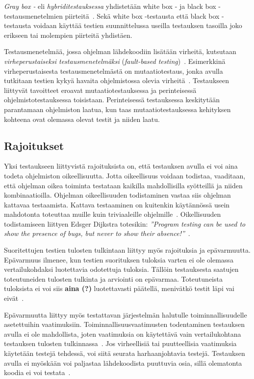 \documentclass[finnish, grading]{tktltiki2}
\theoremstyle{definition}
\theoremstyle{remark}
\begin{document}
\textit{Gray box -} eli \textit{hybriditestauksessa} yhdistetään white box - ja black box -testausmenetelmien piirteitä~\cite[s. 52]{Binder:1999}. Sekä white box -testausta että black box -testausta voidaan käyttää testien suunnittelussa useilla testauksen tasoilla joko erikseen tai molempien piirteitä yhdistäen.

Testausmenetelmää, jossa ohjelman lähdekoodiin lisätään virheitä, kutsutaan \textit{virheperustaiseksi testausmenetelmäksi} (\textit{fault-based testing})~\cite[s. 52]{Binder:1999}. Esimerkkinä virheperustaisesta testausmenetelmästä on mutaatiotestaus, jonka avulla tutkitaan testien kykyä havaita ohjelmistossa olevia virheitä~\cite[s. 36]{DeMillo:Lipton:Sayward:1978}. Testaukseen liittyvät tavoitteet eroavat mutaatiotestauksessa ja perinteisessä ohjelmistotestauksessa toisistaan. Perinteisessä testauksessa keskitytään parantamaan ohjelmiston laatua, kun taas mutaatiotestauksessa kehityksen kohteena ovat olemassa olevat testit ja niiden laatu.

\subsection{Rajoitukset}

Yksi testaukseen liittyvistä rajoituksista on, että testauksen avulla ei voi aina todeta ohjelmiston oikeellisuutta. Jotta oikeellisuus voidaan todistaa, vaaditaan, että ohjelman oikea toiminta testataan kaikilla mahdollisilla syötteillä ja niiden kombinaatioilla. Ohjelman oikeellisuuden todistaminen vastaa siis ohjelman kattavaa testaamista. Kattava testaaminen on kuitenkin käytännössä usein mahdotonta toteuttaa muille kuin triviaaleille ohjelmille~\cite[s. 58]{Binder:1999}. Oikellisuuden todistamiseen liittyen Edsger Dijkstra totesikin: \textit{''Program testing can be used to show the presence of bugs, but never to show their absence!''}~\cite[s. 6]{Dahl:Dijkstra:Hoare:1972}.

Suoritettujen testien tulosten tulkintaan liittyy myös rajoituksia ja epävarmuutta. Epävarmuus ilmenee, kun testien suorituksen tuloksia varten ei ole olemassa  vertailukohdaksi luotettavia odotettuja tuloksia. Tällöin testauksesta saatujen toteutuneiden tulosten tulkinta ja arviointi on epävarmaa. Toteutuneista tuloksista ei voi siis \textbf{aina (?)} luotettavasti päätellä, menivätkö testit läpi vai eivät~\cite[s. 58]{Binder:1999}. 

Epävarmuutta liittyy myös testattavan järjestelmän halutulle toiminnallisuudelle asetettuihin vaatimuksiin. Toiminnallisuusvaatimusten todentaminen testauksen avulla ei ole mahdollista, joten vaatimuksia on käytettävä vain vertailukohtana testauksen tulosten tulkinnassa~\cite[s. 58]{Binder:1999}. Jos virheellisiä tai puutteellisia vaatimuksia käytetään testejä tehdessä, voi siitä seurata harhaanjohtavia testejä. Testauksen avulla ei myöskään voi paljastaa lähdekoodista puuttuvia osia, sillä olematonta koodia ei voi testata~\cite[s. 58]{Binder:1999}.
\end{document}
